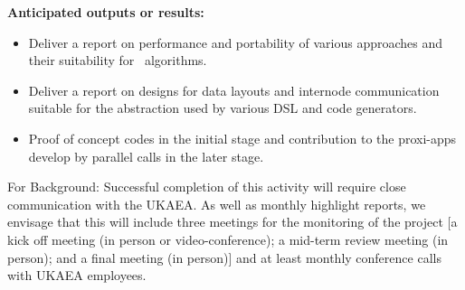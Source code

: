 \documentclass{article}
\begin{document}
\textbf{Anticipated outputs or results:}

\begin{itemize}
\item
Deliver a report on performance and portability of various approaches and their 
suitability for \nep \  algorithms.

\item
Deliver a report on designs for data layouts and internode communication suitable 
for the abstraction used by various DSL and code generators.

\item
Proof of concept codes in the initial stage and contribution to the proxi-apps 
develop by parallel calls in the later stage.
\end{itemize}

For Background:
Successful completion of this activity will require close communication with the 
UKAEA. As well as monthly highlight reports, we envisage that this will include 
three meetings for the monitoring of the project [a kick off meeting (in person 
or video-conference); a mid-term review meeting (in person); and a final meeting 
(in person)] and at least monthly conference calls with UKAEA employees. 

%
\end{document}

